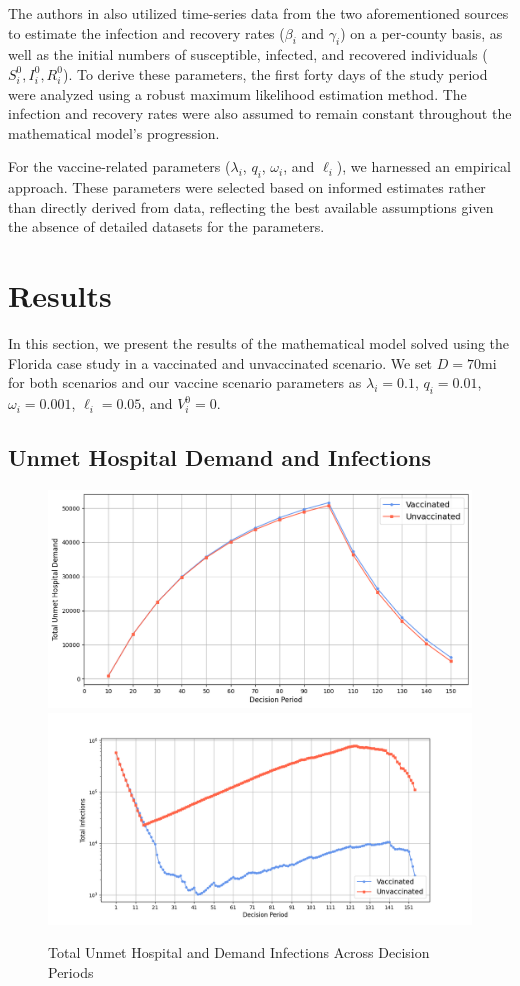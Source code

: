 \documentclass{article}
\begin{document}
The authors in \textcite{abazari2024allocation} also utilized time-series data from the two aforementioned sources to estimate the infection and recovery rates ($\beta_i$ and $\gamma_i$) on a per-county basis, as well as the initial numbers of susceptible, infected, and recovered individuals ($S_i^0, I_i^0, R_i^0$). To derive these parameters, the first forty days of the study period were analyzed using a robust maximum likelihood estimation method. The infection and recovery rates were also assumed to remain constant throughout the mathematical model's progression.

For the vaccine-related parameters ($\lambda_i$, $q_i$, $\omega_i$, and $\ell_i$), we harnessed an empirical approach. These parameters were selected based on informed estimates rather than directly derived from data, reflecting the best available assumptions given the absence of detailed datasets for the parameters. 



\section{Results}
In this section, we present the results of the mathematical model solved using the Florida case study in a vaccinated and unvaccinated scenario. We set $D=70$mi for both scenarios and our vaccine scenario parameters as $\lambda_i = 0.1$,  $q_i = 0.01$, $\omega_i=0.001$, $\ell_i=0.05$, and $V_i^0 = 0$.

\subsection{Unmet Hospital Demand and Infections}
\begin{figure}
    \centering
    \includegraphics[width=0.42\linewidth]{pics/totalUnmetDemandComparison.png}
    \includegraphics[width=0.48\linewidth]{pics/totalInfectionComparison.png}
    \caption{Total Unmet Hospital and Demand Infections Across Decision Periods}
    \label{fig:udInfec}
\end{figure}
\end{document}
